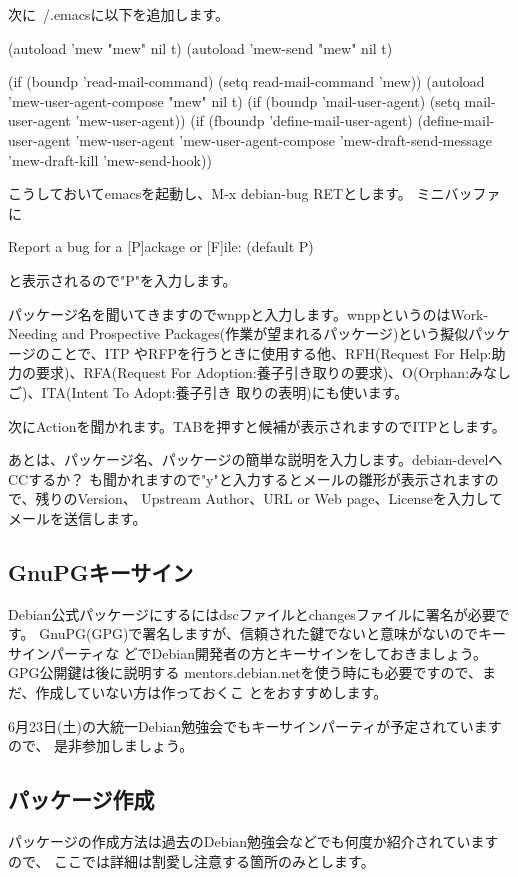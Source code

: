 \documentclass[mingoth,a4paper]{jsarticle}
\begin{document}
   次に~/.emacsに以下を追加します。

\begin{commandline}
(autoload 'mew "mew" nil t)
(autoload 'mew-send "mew" nil t)

(if (boundp 'read-mail-command)
	(setq read-mail-command 'mew))
(autoload 'mew-user-agent-compose "mew" nil t)
(if (boundp 'mail-user-agent)
	(setq mail-user-agent 'mew-user-agent))
(if (fboundp 'define-mail-user-agent)
	(define-mail-user-agent
		'mew-user-agent
		'mew-user-agent-compose
		'mew-draft-send-message
		'mew-draft-kill
		'mew-send-hook))
\end{commandline}

こうしておいてemacsを起動し、M-x debian-bug RETとします。
ミニバッファに

\begin{commandline}
Report a bug for a [P]ackage or [F]ile: (default P) 
\end{commandline}

と表示されるので"P"を入力します。

パッケージ名を聞いてきますのでwnppと入力します。wnppというのはWork-Needing and
Prospective Packages(作業が望まれるパッケージ)という擬似パッケージのことで、ITP
やRFPを行うときに使用する他、RFH(Request For Help:助力の要求)、RFA(Request For
Adoption:養子引き取りの要求)、O(Orphan:みなしご)、ITA(Intent To Adopt:養子引き
取りの表明)にも使います。

次にActionを聞かれます。TABを押すと候補が表示されますのでITPとします。

あとは、パッケージ名、パッケージの簡単な説明を入力します。debian-develへCCするか？
も聞かれますので"y"と入力するとメールの雛形が表示されますので、残りのVersion、
Upstream Author、URL or Web page、Licenseを入力してメールを送信します。

\subsection{GnuPGキーサイン}
Debian公式パッケージにするにはdscファイルとchangesファイルに署名が必要です。
GnuPG(GPG)で署名しますが、信頼された鍵でないと意味がないのでキーサインパーティな
どでDebian開発者の方とキーサインをしておきましょう。GPG公開鍵は後に説明する
mentors.debian.netを使う時にも必要ですので、まだ、作成していない方は作っておくこ
とをおすすめします。

6月23日(土)の大統一Debian勉強会でもキーサインパーティが予定されていますので、
是非参加しましょう。

\subsection{パッケージ作成}
パッケージの作成方法は過去のDebian勉強会などでも何度か紹介されていますので、
ここでは詳細は割愛し注意する箇所のみとします。
\end{document}
